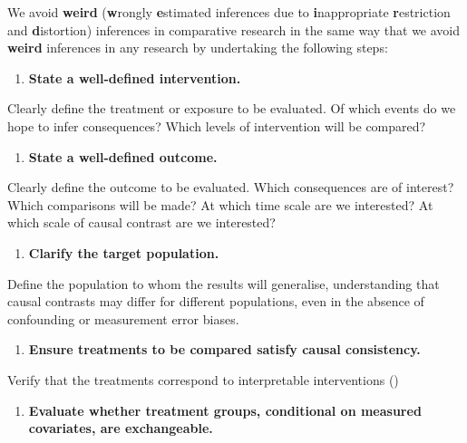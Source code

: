 \documentclass[
  single column]{article}
\providecommand{\tightlist}{%
  \setlength{\itemsep}{0pt}\setlength{\parskip}{0pt}}\usepackage{longtable,booktabs,array}
\begin{document}
We avoid \textbf{weird} (\textbf{w}rongly \textbf{e}stimated inferences
due to \textbf{i}nappropriate \textbf{r}estriction and
\textbf{d}istortion) inferences in comparative research in the same way
that we avoid \textbf{weird} inferences in any research by undertaking
the following steps:

\begin{enumerate}
\def\labelenumi{\arabic{enumi}.}
\tightlist
\item
  \textbf{State a well-defined intervention.}
\end{enumerate}

Clearly define the treatment or exposure to be evaluated. Of which
events do we hope to infer consequences? Which levels of intervention
will be compared?

\begin{enumerate}
\def\labelenumi{\arabic{enumi}.}
\setcounter{enumi}{1}
\tightlist
\item
  \textbf{State a well-defined outcome.}
\end{enumerate}

Clearly define the outcome to be evaluated. Which consequences are of
interest? Which comparisons will be made? At which time scale are we
interested? At which scale of causal contrast are we interested?

\begin{enumerate}
\def\labelenumi{\arabic{enumi}.}
\setcounter{enumi}{2}
\tightlist
\item
  \textbf{Clarify the target population.}
\end{enumerate}

Define the population to whom the results will generalise, understanding
that causal contrasts may differ for different populations, even in the
absence of confounding or measurement error biases.

\begin{enumerate}
\def\labelenumi{\arabic{enumi}.}
\setcounter{enumi}{3}
\tightlist
\item
  \textbf{Ensure treatments to be compared satisfy causal consistency.}
\end{enumerate}

Verify that the treatments correspond to interpretable interventions
()

\begin{enumerate}
\def\labelenumi{\arabic{enumi}.}
\setcounter{enumi}{4}
\tightlist
\item
  \textbf{Evaluate whether treatment groups, conditional on measured
  covariates, are exchangeable.}
\end{enumerate}
\end{document}
